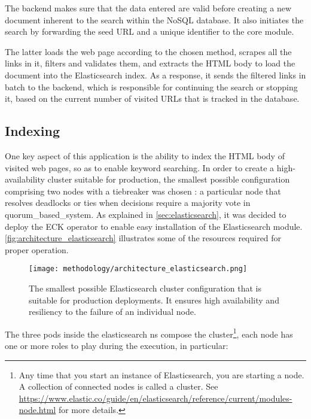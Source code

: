\documentclass[../thesis.tex]{subfiles}
\begin{document}
The backend makes sure that the data entered are valid before creating a new document inherent to the search within the NoSQL database. It also initiates the search by forwarding the seed \acrshort{URL} and a unique identifier to the core module.

The latter loads the web page according to the chosen method, scrapes all the links in it, filters and validates them, and extracts the \acrshort{HTML} body to load the document into the Elasticsearch index. As a response, it sends the filtered links in batch to the backend, which is responsible for continuing the search or stopping it, based on the current number of visited \acrshort{URL}s that is tracked in the database.

\subsection{Indexing}
One key aspect of this application is the ability to index the \acrshort{HTML} body of visited web pages, so as to enable keyword searching. In order to create a high-availability cluster suitable for production, the smallest possible configuration comprising two nodes with a tiebreaker was chosen \cite{site:elasticsearch_cluster_conf}: a particular node that resolves deadlocks or ties when decisions require a majority vote in \gls{quorum_based_system}. As explained in \ref{sec:elasticsearch}, it was decided to deploy the \acrshort{ECK} operator to enable easy installation of the Elasticsearch module. \autoref{fig:architecture_elasticsearch} illustrates some of the resources required for proper operation.

\begin{figure}[H]
    \centering
    \texttt{[image: methodology/architecture\_elasticsearch.png]}
    \caption[Elasticsearch cluster configuration]{The smallest possible Elasticsearch cluster configuration that is suitable for production deployments. It ensures high availability and resiliency to the failure of an individual node.}
    \label{fig:architecture_elasticsearch}
\end{figure}

The three \gls{pod}s inside the elasticsearch \gls{ns} compose the cluster\footnote{Any time that you start an instance of Elasticsearch, you are starting a node. A collection of connected nodes is called a cluster. See \href{https://www.elastic.co/guide/en/elasticsearch/reference/current/modules-node.html}{https://www.elastic.co/guide/en/elasticsearch/reference/current/modules-node.html} for more details.}, each node has one or more roles to play during the execution, in particular:
\end{document}
